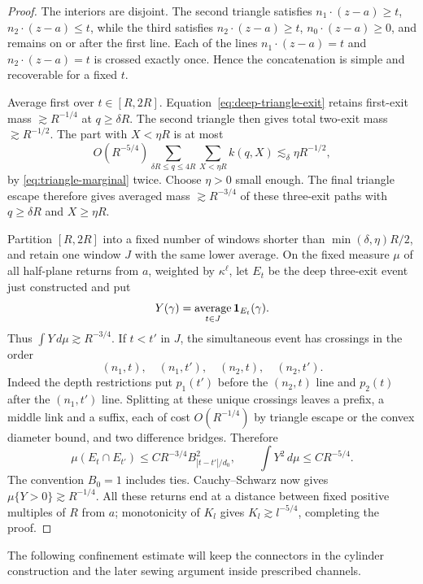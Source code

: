 \begin{proof}
The interiors are disjoint. The second triangle satisfies
\(n_1\cdot(z-a)\ge t\), \(n_2\cdot(z-a)\le t\), while the third satisfies
\(n_2\cdot(z-a)\ge t\), \(n_0\cdot(z-a)\ge0\), and remains on or after the first line. Each of the lines \(n_1\cdot(z-a)=t\) and \(n_2\cdot(z-a)=t\) is crossed exactly once. Hence the concatenation is simple and recoverable for a fixed \(t\).

Average first over \(t\in[R,2R]\). Equation~\eqref{eq:deep-triangle-exit} retains first-exit mass \(\gtrsim R^{-1/4}\) at \(q\ge\delta R\). The second triangle then gives total two-exit mass \(\gtrsim R^{-1/2}\). The part with \(X<\eta R\) is at most
\[
 O(R^{-5/4})\sum_{\delta R\le q\le4R}\sum_{X<\eta R}k(q,X)
       \lesssim_\delta\eta R^{-1/2},
\]
by \eqref{eq:triangle-marginal} twice. Choose \(\eta>0\) small enough. The final triangle escape therefore gives averaged mass \(\gtrsim R^{-3/4}\) of these three-exit paths with \(q\ge\delta R\) and \(X\ge\eta R\).

Partition \([R,2R]\) into a fixed number of windows shorter than
\(\min(\delta,\eta)R/2\), and retain one window \(J\) with the same lower average. On the fixed measure \(\mu\) of all half-plane returns from \(a\), weighted by \(\kappa^{\ell}\), let \(E_t\) be the deep three-exit event just constructed and put
\[
 Y(\gamma)=\mathop{\mathrm{average}}_{t\in J}{\bf1}_{E_t}(\gamma).
\]
Thus \(\int Y\,d\mu\gtrsim R^{-3/4}\). If \(t<t'\) in \(J\), the simultaneous event has crossings in the order
\[
 (n_1,t),\quad(n_1,t'),\quad(n_2,t),\quad(n_2,t').
\]
Indeed the depth restrictions put \(p_1(t')\) before the \((n_2,t)\) line and \(p_2(t)\) after the \((n_1,t')\) line. Splitting at these unique crossings leaves a prefix, a middle link and a suffix, each of cost \(O(R^{-1/4})\) by triangle escape or the convex diameter bound, and two difference bridges. Therefore
\[
 \mu(E_t\cap E_{t'})\le C R^{-3/4}B_{|t-t'|/d_0}^{2},
 \qquad
 \int Y^2\,d\mu\le C R^{-5/4}.
\]
The convention \(B_0=1\) includes ties. Cauchy--Schwarz now gives
\(\mu\{Y>0\}\gtrsim R^{-1/4}\). All these returns end at a distance between fixed positive multiples of \(R\) from \(a\); monotonicity of \(K_l\) gives \(K_l\gtrsim l^{-5/4}\), completing the proof.

\end{proof}

The following confinement estimate will keep the connectors in the cylinder construction and the later sewing argument inside prescribed channels.

